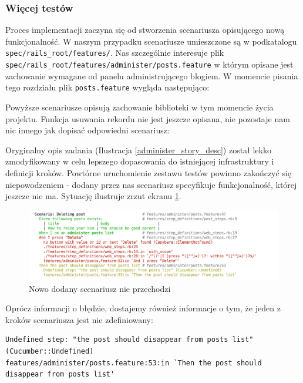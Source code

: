   	\subsubsection{Więcej testów}
  	  Proces implementacji zaczyna się od stworzenia scenariusza opisującego nową funkcjonalność. W naszym przypadku scenariusze umieszczone są w podkatalogu \texttt{spec/rails\_root/features/}. Nas szczególnie interesuje plik \texttt{spec/rails\_root/features/administer/posts.feature} w którym opisane jest zachowanie wymagane od panelu administrującego blogiem. W momencie pisania tego rozdziału plik \texttt{posts.feature} wygląda następująco:
  	  
  	
  	
  	Powyższe scenariusze opisują zachowanie biblioteki w tym momencie życia projektu. Funkcja usuwania rekordu nie jest jeszcze opisana, nie pozostaje nam nic innego jak dopisać odpowiedni scenariusz:
  	
  	
  	
  	Oryginalny opis zadania (Ilustracja \ref{administer_story_desc}) został lekko zmodyfikowany w celu lepszego dopasowania do istniejącej infrastruktury i definicji kroków. Powtórne uruchomienie zestawu testów powinno zakończyć się niepowodzeniem - dodany przez nas scenariusz specyfikuje funkcjonalność, której jeszcze nie ma. Sytuację ilustruje zrzut ekranu \ref{scenario_failure}.
  	
  	\clearpage
  	
  	\begin{figure}[!h]
  		\begin{center}
  			\includegraphics[width=\linewidth]{images/scenario_failure.png}
  			\caption{Nowo dodany scenariusz nie przechodzi}
  			\label{scenario_failure}
  		\end{center}
  	\end{figure}
  	
  	Oprócz informacji o błędzie, dostajemy również informacje o tym, że jeden z kroków scenariusza jest nie zdefiniowany:
  	
\begin{lstlisting}
Undefined step: "the post should disappear from posts list" (Cucumber::Undefined)
features/administer/posts.feature:53:in `Then the post should disappear from posts list'
\end{lstlisting}
    
